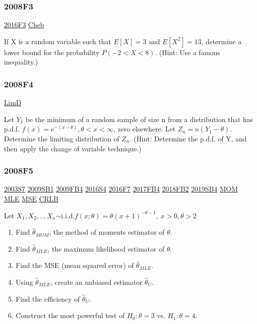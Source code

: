 \documentclass[10pt,twocolumn,portrait]{article}
\begin{document}
\hypertarget{f3-3}{%
\subsubsection{2008F3}\label{f3-3}}

\protect\hyperlink{f3-6}{2016F3} \protect\hyperlink{section-1}{Cheb}

If X is a random variable such that \(E[X]=3\) and \(E[X^2]=13\),
determine a lower bound for the probability \(P(-2<X<8)\). (Hint: Use a
famous inequality.)

\hypertarget{f4-3}{%
\subsubsection{2008F4}\label{f4-3}}

\protect\hyperlink{LimD}{LimD}

Let \(Y_1\) be the minimum of a random sample of size n from a
distribution that has p.d.f. \(f(x)=e^{-(x-\theta)},\theta<x<\infty\),
zero elsewhere. Let \(Z_n= n(Y_1-\theta)\). Determine the limiting
distribution of \(Z_n\). (Hint: Determine the p.d.f. of Y, and then
apply the change of variable technique.)

\hypertarget{f5-3}{%
\subsubsection{2008F5}\label{f5-3}}

\protect\hyperlink{s7}{2003S7} \protect\hyperlink{sb1}{2009SB1}
\protect\hyperlink{fb4}{2009FB4} \protect\hyperlink{s4-4}{2016S4}
\protect\hyperlink{f7-5}{2016F7} \protect\hyperlink{fb4-3}{2017FB4}
\protect\hyperlink{fb2-4}{2018FB2} \protect\hyperlink{sb4-2}{2019SB4}
\protect\hyperlink{section-2}{MOM} \protect\hyperlink{MLE}{MLE}
\protect\hyperlink{section-4}{MSE} \protect\hyperlink{section-5}{CRLB}

Let
\(X_1,X_2,..,X_n\)\(\sim\)i.i.d.\(f(x;\theta)=\theta(x+1)^{-\theta-1},\ x>0,\theta>2\)

\begin{enumerate}
\def\labelenumi{\alph{enumi}.}
\item
  Find \(\hat\theta_{MOM}\), the method of moments estimator of
  \(\theta\).
\item
  Find \(\hat\theta_{MLE}\), the maximum likelihood estimator of
  \(\theta\).
\item
  Find the MSE (mean squared error) of \(\hat\theta_{MLE}\).
\item
  Using \(\hat\theta_{MLE}\), create an unbiased estimator
  \(\hat\theta_{U}\).
\item
  Find the efficiency of \(\hat\theta_{U}\).
\item
  Construct the most powerful test of \(H_0:\theta=3\) vs.
  \(H_1:\theta=4\).
\end{enumerate}
\end{document}
